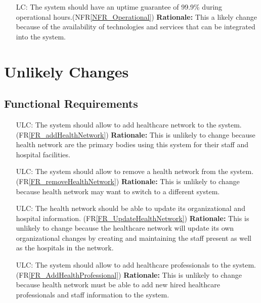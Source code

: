 \documentclass[12pt]{article}
\newcounter{lcnum} %
\newcounter{ulcnum} %
\begin{document}
\begin{itemize}
\begin{itemize}
  \item[LC\refstepcounter{lcnum}\thelcnum\label{LC_operational}:] The system should have an uptime guarantee of 99.9\% during operational hours.(NFR\ref{NFR_Operational})
  \textbf{Rationale:} This a likely change because of the availability of technologies and services that can be integrated into the system.

\end{itemize}



\section{Unlikely Changes}   


\subsection{Functional Requirements}
\noindent \begin{itemize}
\item[ULC\refstepcounter{ulcnum}\theulcnum\label{ULC_addHealthNetwork}:] The system should allow to add healthcare network to the system. (FR\ref{FR_addHealthNetwork})
\textbf{Rationale:} This is unlikely to change because health network are the primary bodies using this system for their staff and hospital facilities.

\item[ULC\refstepcounter{ulcnum}\theulcnum\label{ULC_removeHealthNetwork}:]  The system should allow to remove a health network from the system. (FR\ref{FR_removeHealthNetwork})
\textbf{Rationale:} This is unlikely to change because health network may want to switch to a different system.

\item[ULC\refstepcounter{ulcnum}\theulcnum\label{ULC_updateHealthNetwork}:] The health network should be able to update its organizational and hospital information. (FR\ref{FR_UpdateHealthNetwork})
\textbf{Rationale:} This is unlikely to change because the healthcare network will update its own organizational changes by creating and maintaining the staff present as well as the hospitals in the network.

\item[ULC\refstepcounter{ulcnum}\theulcnum\label{ULC_addHealthProfessional}:] The system should allow to add healthcare professionals to the system. (FR\ref{FR_AddHealthProfessional})
\textbf{Rationale:} This is unlikely to change because health network must be able to add new hired healthcare professionals and staff information to the system.


\end{itemize}
\end{itemize}
\end{document}
